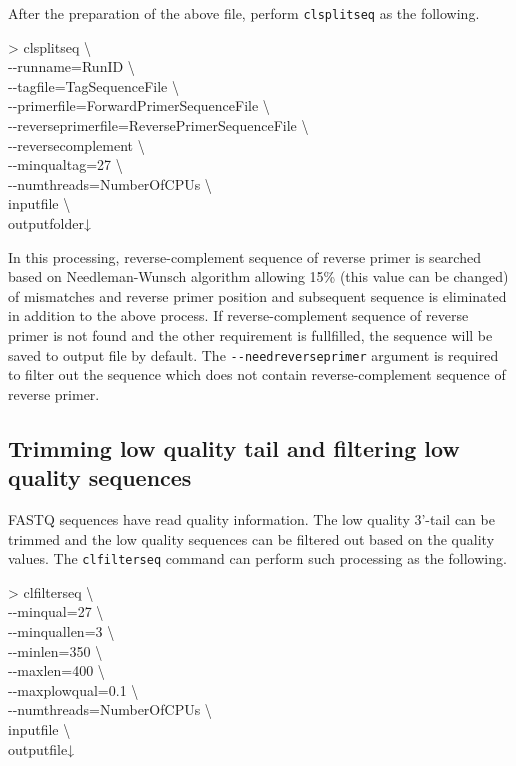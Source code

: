 \documentclass[titlepage,10pt,a4paper,english]{jsbook}
\newenvironment{cmd}{\begin{oframed}\raggedright\ttfamily\footnotesize\setlength{\baselineskip}{1.4em}}{\end{oframed}\vspace{-1em}}
\begin{document}
After the preparation of the above file, perform \texttt{clsplitseq} as the following.
\begin{cmd}
{\textgreater} clsplitseq {\textbackslash}\\
{-}{-}runname=RunID {\textbackslash}\\
{-}{-}tagfile=TagSequenceFile {\textbackslash}\\
{-}{-}primerfile=ForwardPrimerSequenceFile {\textbackslash}\\
{-}{-}reverseprimerfile=ReversePrimerSequenceFile {\textbackslash}\\
{-}{-}reversecomplement {\textbackslash}\\
{-}{-}minqualtag=27 {\textbackslash}\\
{-}{-}numthreads=NumberOfCPUs {\textbackslash}\\
inputfile {\textbackslash}\\
outputfolder↓
\end{cmd}
In this processing, reverse-complement sequence of reverse primer is searched based on Needleman-Wunsch algorithm allowing 15\% (this value can be changed) of mismatches and reverse primer position and subsequent sequence is eliminated in addition to the above process.
If reverse-complement sequence of reverse primer is not found and the other requirement is fullfilled, the sequence will be saved to output file by default.
The \texttt{{-}{-}needreverseprimer} argument is required to filter out the sequence which does not contain reverse-complement sequence of reverse primer.

\subsection{Trimming low quality tail and filtering low quality sequences}\label{subsection:qualityfilteringfor454}

FASTQ sequences have read quality information.
The low quality 3'-tail can be trimmed and the low quality sequences can be filtered out based on the quality values.
The \texttt{clfilterseq} command can perform such processing as the following.
\begin{cmd}
{\textgreater} clfilterseq {\textbackslash}\\
{-}{-}minqual=27 {\textbackslash}\\
{-}{-}minquallen=3 {\textbackslash}\\
{-}{-}minlen=350 {\textbackslash}\\
{-}{-}maxlen=400 {\textbackslash}\\
{-}{-}maxplowqual=0.1 {\textbackslash}\\
{-}{-}numthreads=NumberOfCPUs {\textbackslash}\\
inputfile {\textbackslash}\\
outputfile↓
\end{cmd}
\end{document}
